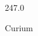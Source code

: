 \documentclass[12pt]{article}
\begin{document}
\hfill{}
\vfill
\begin{center}
  {\fontsize{50}{60}
  }

  \vspace{1em}

  247.0

Curium
\end{center}
\vfill
\end{document}
